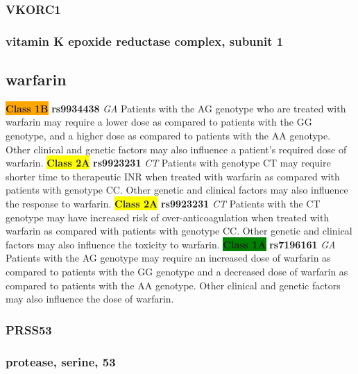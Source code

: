 \documentclass{book}
\begin{document}
\subsubsection{ VKORC1 }
\subsubsection{ vitamin K epoxide reductase complex, subunit 1 }

\subsection{ warfarin }


\begin{center}

\textbf{\colorbox{orange} {Class 1B}} \textbf{ rs9934438 } \textit{ GA }
Patients with the AG genotype who are treated with warfarin may require a lower dose as compared to patients with the GG genotype, and a higher dose as compared to patients with the AA genotype. Other clinical and genetic factors may also influence a patient’s required dose of warfarin. 
\textbf{\colorbox{yellow} {Class 2A}} \textbf{ rs9923231 } \textit{ CT }
Patients with genotype CT may require shorter time to therapeutic INR when treated with warfarin as compared with patients with genotype CC. Other genetic and clinical factors may also influence the response to warfarin. \textbf{\colorbox{yellow} {Class 2A}} \textbf{ rs9923231 } \textit{ CT }
Patients with the CT genotype may have increased risk of over-anticoagulation when treated with warfarin as compared with patients with genotype CC. Other genetic and clinical factors may also influence the toxicity to warfarin.
\textbf{\colorbox{green} {Class 1A}} \textbf{ rs7196161 } \textit{ GA }
Patients with the AG genotype may require an increased dose of warfarin as compared to patients with the GG genotype and a decreased dose of warfarin as compared to patients with the AA genotype. Other clinical and genetic factors may also influence the dose of warfarin. 

\end{center}






\subsubsection{ PRSS53 }
\subsubsection{ protease, serine, 53 }
\end{document}
